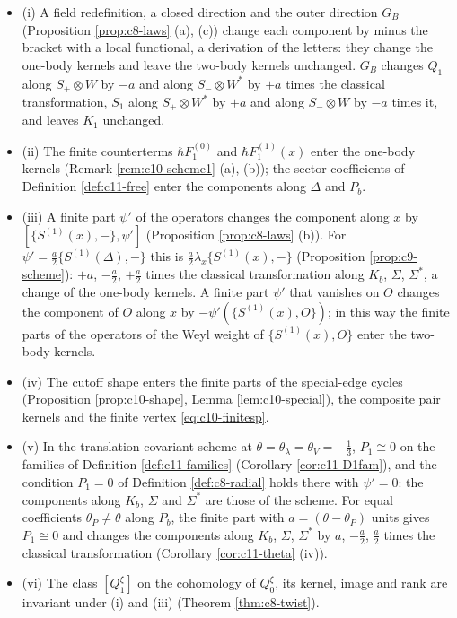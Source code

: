 \begin{proposition}
\label{prop:c11-freedom}
\begin{itemize}
\item (i) A field redefinition, a closed direction and the outer direction $G_B$ (Proposition \ref{prop:c8-laws} (a), (c)) change each component by minus the bracket with a local functional, a derivation of the letters: they change the one-body kernels and leave the two-body kernels unchanged. $G_B$ changes $Q_1$ along $S_+\otimes W$ by $-a$ and along $S_-\otimes W^*$ by $+a$ times the classical transformation, $S_1$ along $S_+\otimes W^*$ by $+a$ and along $S_-\otimes W$ by $-a$ times it, and leaves $K_1$ unchanged.
\item (ii) The finite counterterms $\hbar F_1^{(0)}$ and $\hbar F_1^{(1)}(x)$ enter the one-body kernels (Remark \ref{rem:c10-scheme1} (a), (b)); the sector coefficients of Definition \ref{def:c11-free} enter the components along $\Delta$ and $P_b$.
\item (iii) A finite part $\psi'$ of the operators changes the component along $x$ by $[\{S^{(1)}(x),-\},\psi']$ (Proposition \ref{prop:c8-laws} (b)). For $\psi'=\tfrac a2\{S^{(1)}(\Delta),-\}$ this is $\tfrac a2\lambda_x\{S^{(1)}(x),-\}$ (Proposition \ref{prop:c9-scheme}): $+a$, $-\tfrac a2$, $+\tfrac a2$ times the classical transformation along $K_b$, $\Sigma$, $\Sigma^*$, a change of the one-body kernels. A finite part $\psi'$ that vanishes on $O$ changes the component of $O$ along $x$ by $-\psi'(\{S^{(1)}(x),O\})$; in this way the finite parts of the operators of the Weyl weight of $\{S^{(1)}(x),O\}$ enter the two-body kernels.
\item (iv) The cutoff shape enters the finite parts of the special-edge cycles (Proposition \ref{prop:c10-shape}, Lemma \ref{lem:c10-special}), the composite pair kernels and the finite vertex \eqref{eq:c10-finitesp}.
\item (v) In the translation-covariant scheme at $\theta=\theta_\lambda=\theta_V=-\tfrac13$, $P_1\cong0$ on the families of Definition \ref{def:c11-families} (Corollary \ref{cor:c11-D1fam}), and the condition $P_1=0$ of Definition \ref{def:c8-radial} holds there with $\psi'=0$: the components along $K_b$, $\Sigma$ and $\Sigma^*$ are those of the scheme. For equal coefficients $\theta_P\ne\theta$ along $P_b$, the finite part with $a=(\theta-\theta_P)$ units gives $P_1\cong0$ and changes the components along $K_b$, $\Sigma$, $\Sigma^*$ by $a$, $-\tfrac a2$, $\tfrac a2$ times the classical transformation (Corollary \ref{cor:c11-theta} (iv)).
\item (vi) The class $[Q^\xi_1]$ on the cohomology of $Q^\xi_0$, its kernel, image and rank are invariant under (i) and (iii) (Theorem \ref{thm:c8-twist}).
\end{itemize}
\end{proposition}

